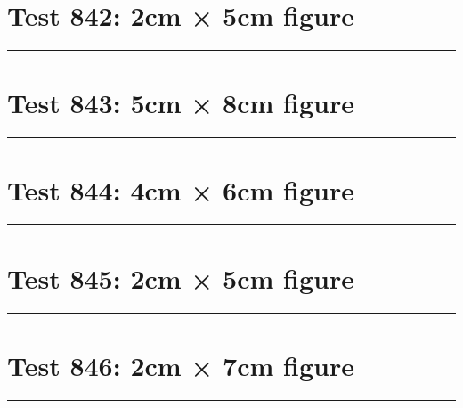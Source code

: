 \documentclass[a4paper,11pt]{article}
\begin{document}
\section*{Test 842: 2cm × 5cm figure}
\begin{swarmwrap}%
  \begin{minipage}[t]{2cm}
    \centering
    \rule{\linewidth}{5cm}
  \end{minipage}%
\end{swarmwrap}%
\swarmwrapnext
\lipsum[52]
\lipsum[53]
\lipsum[54]
\lipsum[55]
\section*{Test 843: 5cm × 8cm figure}
\begin{swarmwrap}%
  \begin{minipage}[t]{5cm}
    \centering
    \rule{\linewidth}{8cm}
  \end{minipage}%
\end{swarmwrap}%
\swarmwrapnext
\lipsum[23]
\lipsum[24]
\lipsum[25]
\lipsum[26]
\lipsum[27]
\section*{Test 844: 4cm × 6cm figure}
\begin{swarmwrap}%
  \begin{minipage}[t]{4cm}
    \centering
    \rule{\linewidth}{6cm}
  \end{minipage}%
\end{swarmwrap}%
\swarmwrapnext
\lipsum[7]
\lipsum[8]
\lipsum[9]
\section*{Test 845: 2cm × 5cm figure}
\begin{swarmwrap}%
  \begin{minipage}[t]{2cm}
    \centering
    \rule{\linewidth}{5cm}
  \end{minipage}%
\end{swarmwrap}%
\swarmwrapnext
\lipsum[34]
\lipsum[35]
\lipsum[36]
\lipsum[37]
\lipsum[38]
\lipsum[39]
\section*{Test 846: 2cm × 7cm figure}
\begin{swarmwrap}%
  \begin{minipage}[t]{2cm}
    \centering
    \rule{\linewidth}{7cm}
  \end{minipage}%
\end{swarmwrap}%
\swarmwrapnext
\lipsum[12]
\lipsum[13]
\lipsum[14]
\end{document}
